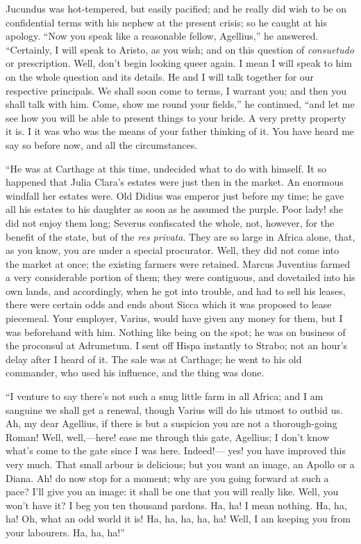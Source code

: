 Jucundus was hot-tempered, but easily pacified; and he really did
wish to be on confidential terms with his nephew at the present
crisis; so he caught at his apology. ``Now you speak like a
reasonable fellow, Agellius,'' he answered. ``Certainly, I
will speak to Aristo, as you wish; and on this question of \emph{consuetudo}
or prescription. Well, don't begin looking queer again. I mean I will
speak to him on the whole question and its details. He and I will talk
together for our respective principals. We shall soon come to terms, I
warrant you; and then you shall talk with him. Come, show me round
your fields,'' he continued, ``and let me see how you will be
able to present things to your bride. A very pretty property it is. I
it was who was the means of your father thinking of it. You have heard
me say so before now, and all the circumstances.

``He was at Carthage at this time, undecided what to do with
himself. It so happened that Julia Clara's estates were just then in
the market. An enormous windfall her estates were. Old Didius was
emperor just before my time; he gave all his estates to his daughter
as soon as he assumed the purple. Poor lady! she did not enjoy them
long; Severus confiscated the whole, not, however, for the benefit of
the state, but of the \emph{res privata}. They are so large in Africa
alone, that, as you know, you are under a special procurator. Well,
they did not come into the market at once; the existing farmers were
retained. Marcus Juventius farmed a very considerable portion of them;
they were contiguous, and dovetailed into his own lands, and
accordingly, when he got into trouble, and had to sell his leases,
there were certain odds and ends about Sicca which it was proposed to
lease piecemeal. Your employer, Varius, would have given any
money for them, but I was beforehand with him. Nothing like being on
the spot; he was on business of the proconsul at Adrumetum. I sent off
Hispa instantly to Strabo; not an hour's delay after I heard of it.
The sale was at Carthage; he went to his old commander, who used his
influence, and the thing was done.

``I venture to say there's not such a snug little farm in all
Africa; and I am sanguine we shall get a renewal, though Varius will
do his utmost to outbid us. Ah, my dear Agellius, if there is but a
suspicion you are not a thorough-going Roman! Well, well,—here! ease
me through this gate, Agellius; I don't know what's come to the gate
since I was here. Indeed!— yes! you have improved this very much.
That small arbour is delicious; but you want an image, an Apollo or a
Diana. Ah! do now stop for a moment; why are you going forward at such
a pace? I'll give you an image: it shall be one that you will really
like. Well, you won't have it? I beg you ten thousand pardons. Ha, ha!
I mean nothing. Ha, ha, ha! Oh, what an odd world it is! Ha, ha, ha,
ha, ha! Well, I am keeping you from your labourers. Ha, ha, ha!''


